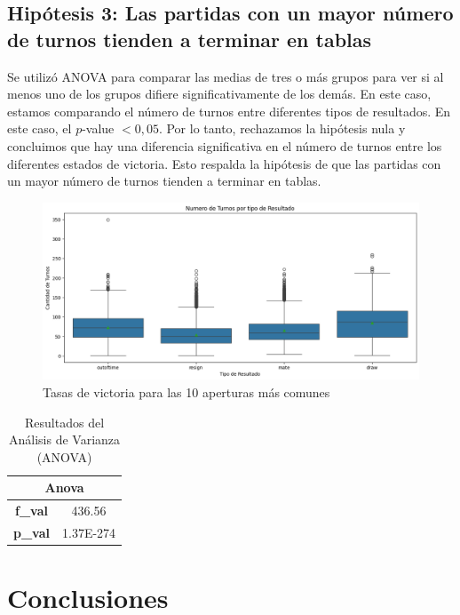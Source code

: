 \documentclass[a4paper, 12pt]{article}
\begin{document}
\newpage

\subsection{Hipótesis 3: Las partidas con un mayor número de turnos tienden a terminar en tablas}
Se utilizó ANOVA para comparar las medias de tres o más grupos para ver si al menos uno de los grupos difiere significativamente de los demás. En este caso, estamos comparando el número de turnos entre diferentes tipos de resultados.
En este caso, el $p$-value $< 0{,}05$. 
Por lo tanto, rechazamos la hipótesis nula y concluimos que hay una diferencia significativa en el número de turnos entre los diferentes estados de victoria. Esto respalda la hipótesis de que las partidas con un mayor número de turnos tienden a terminar en tablas.

\begin{figure}[H]
    \centering
    \includegraphics[width=\textwidth]{../Imagenes/Hipotesis_3.png}
    \caption{Tasas de victoria para las 10 aperturas más comunes}
    \label{fig:opening_win_rates}
\end{figure}


\begin{table}[h!]
    \centering
    \begin{tabular}{|c|c|}
        \hline
        \multicolumn{2}{|c|}{\textbf{Anova}} \\ \hline
        \textbf{f\_val} & 436.56 \\ \hline
        \textbf{p\_val} & 1.37E-274 \\ \hline
    \end{tabular}
    \caption{Resultados del Análisis de Varianza (ANOVA)}
    \label{table:anova}
\end{table}


\newpage

\section{Conclusiones}
\end{document}
